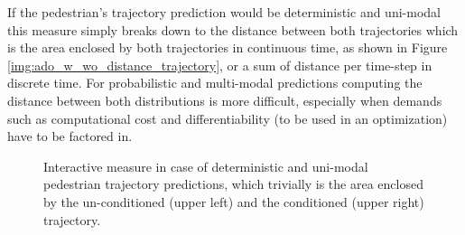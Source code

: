 If the pedestrian's trajectory prediction would be deterministic and uni-modal this measure simply breaks down to the distance between both trajectories which is the area enclosed by both trajectories in continuous time, as shown in Figure \ref{img:ado_w_wo_distance_trajectory}, or a sum of distance per time-step in discrete time. For probabilistic and multi-modal predictions computing the distance between both distributions is more difficult, especially when demands such as computational cost and differentiability (to be used in an optimization) have to be factored in. 

\begin{figure}[!ht]
\begin{center}
\end{center}
\caption{Interactive measure in case of deterministic and uni-modal pedestrian trajectory predictions, which trivially is the area enclosed by the un-conditioned (upper left) and the conditioned (upper right) trajectory.}
\label{img:int_acceleration_reason}
\end{figure}

